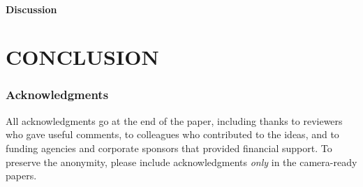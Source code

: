 \documentclass[twoside]{article}
\begin{document}
\paragraph{Discussion}


\section{CONCLUSION}

\subsubsection*{Acknowledgments}
All acknowledgments go at the end of the paper, including thanks to reviewers who gave useful comments, to colleagues who contributed to the ideas, and to funding agencies and corporate sponsors that provided financial support. 
To preserve the anonymity, please include acknowledgments \emph{only} in the camera-ready papers.


\end{document}
